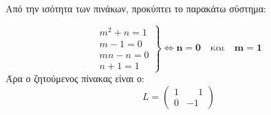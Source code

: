 \begin{enumerate}
Από την ισότητα των πινάκων, προκύπτει το παρακάτω σύστημα:

\[
\left.
\begin{align*}
m^2+n=1 \\
m-1=0 \\
mn-n=0 \\
n+1=1
\end{align*}
\right\}\Leftrightarrow \boldsymbol{n=0} \quad\text{και}\quad \boldsymbol{m=1}
\]
Άρα ο ζητούμενος πίνακας είναι ο:
\[
L=\begin{pmatrix}
1 & \phantom{-}1 \\
0 & -1
\end{pmatrix}
\]

\end{enumerate}


